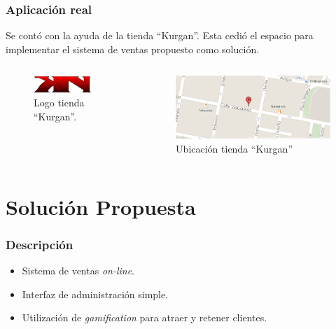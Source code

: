 \documentclass[10pt, compress]{beamer}
\begin{document}
\begin{frame}
 \frametitle{Aplicación real}

Se contó con la ayuda de la tienda ``Kurgan''. Esta cedió el espacio para implementar el sistema de ventas
propuesto como solución.

\begin{columns}[onlytextwidth]
\begin{figure}
\centering
    \includegraphics[width=0.8\textwidth]{images/logo.png}
    \caption{Logo tienda ``Kurgan''.}
    \label{fig:awesome_image}
\end{figure}

\begin{figure}
\centering
    \includegraphics[width=1.0\textwidth]{images/mapa.png}
    \caption{Ubicación tienda ``Kurgan''}
    \label{fig:awesome_image}
\end{figure}

\end{columns}
\end{frame}

\section{Solución Propuesta}

\begin{frame}
 \frametitle{Descripción}

\begin{itemize}
 \item Sistema de ventas \emph{on-line}.
 \item Interfaz de administración simple.
 \item Utilización de \emph{gamification} para atraer y retener clientes.
\end{itemize}
\end{frame}
\end{document}
